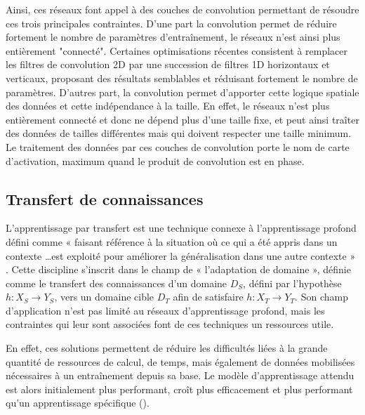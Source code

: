 Ainsi, ces réseaux font appel à des couches de convolution permettant de résoudre ces trois principales contraintes. D'une part la convolution permet de réduire fortement le nombre de paramètres d'entraînement, le réseaux n'est ainsi plus entièrement "connecté". Certaines optimisations récentes consistent à remplacer les filtres de convolution 2D par une succession de filtres 1D horizontaux et verticaux, proposant des résultats semblables et réduisant fortement le nombre de paramètres. D'autres part, la convolution permet d'apporter cette logique spatiale des données et cette indépendance à la taille. En effet, le réseaux n'est plus entièrement connecté et donc ne dépend plus d'une taille fixe, et peut ainsi traîter des données de tailles différentes mais qui doivent respecter une taille minimum. Le traitement des données par ces couches de convolution porte le nom de carte d'activation, maximum quand le produit de convolution est en phase.\par


\clearpage

\subsection{Transfert de connaissances}
\label{sec:transfer_learning}
L’apprentissage par transfert est une technique connexe à l’apprentissage profond défini comme « faisant référence à la situation où ce qui a été appris dans un contexte \ldots est exploité pour améliorer la généralisation dans une autre contexte » \cite{Ngiam2011}. Cette discipline s’inscrit dans le champ de « l’adaptation de domaine », définie comme le transfert des connaissances d’un domaine $D_S$, défini par l’hypothèse $h: X_S \rightarrow Y_S$, vers un domaine cible $D_T$ afin de satisfaire $h: X_T \rightarrow Y_T$. Son champ d'application n'est pas limité au réseaux d'apprentissage profond, mais les contraintes qui leur sont associées font de ces techniques un ressources utile.\par

En effet, ces solutions permettent de réduire les difficultés liées à la grande quantité de ressources de calcul, de temps, mais également de données mobilisées nécessaires à un entraînement depuis sa base. Le modèle d’apprentissage attendu est alors initialement plus performant, croît plus efficacement et plus performant qu’un apprentissage spécifique  ().\par

